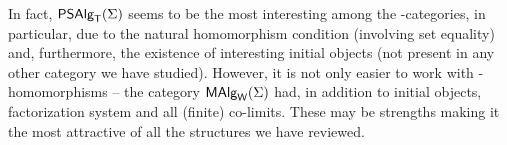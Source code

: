\documentclass[10pt]{article}
\begin{document}
\begin{enumerate}
In fact, $\mbox{\sf PSAlg}_{\sf T}(\Sigma)$ seems to be the most interesting among the
\PS-categories, in particular, due to the natural homomorphism
condition (involving set equality) and, furthermore, the existence of
interesting initial objects (not present in any other category we have
studied). However, it is not only easier to work with
\PP-homomorphisms -- the category $\mbox{\rm\sf MAlg}_{\sf W}(\Sigma)$ had, in addition to initial
objects, factorization system and all (finite) co-limits. These may be
strengths making it the most attractive of all the structures we have
reviewed.
\end{enumerate}




\end{document}
